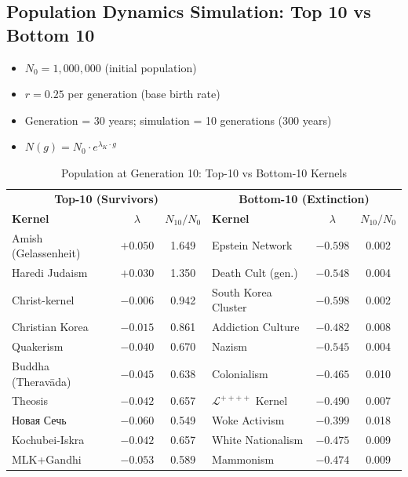 \documentclass[11pt,a4paper]{article}
\theoremstyle{definition}
\theoremstyle{remark}
\newcommand{\LondonOp}{\mathcal{L}^{++++}}  %
\begin{document}
\subsection{Population Dynamics Simulation: Top 10 vs Bottom 10}
\label{sec:pop-dynamics}

\begin{scibox}
\begin{itemize}[noitemsep]
  \item $N_0 = 1{,}000{,}000$ (initial population)
  \item $r = 0.25$ per generation (base birth rate)
  \item Generation = 30 years; simulation = 10 generations (300 years)
  \item $N(g) = N_0 \cdot e^{\lambda_K \cdot g}$
\end{itemize}
\end{scibox}

\begin{table}[H]
\centering
\caption{Population at Generation 10: Top-10 vs Bottom-10 Kernels}
\label{tab:pop-sim}
\begin{tabular}{@{}lcc|lcc@{}}
\toprule
\multicolumn{3}{c|}{\textbf{Top-10 (Survivors)}} &
\multicolumn{3}{c}{\textbf{Bottom-10 (Extinction)}} \\
\textbf{Kernel} & $\lambda$ & $N_{10}/N_0$ &
\textbf{Kernel} & $\lambda$ & $N_{10}/N_0$ \\
\midrule
Amish (Gelassenheit) & $+0.050$ & 1.649 &
  Epstein Network  & $-0.598$ & 0.002 \\
Haredi Judaism       & $+0.030$ & 1.350 &
  Death Cult (gen.)  & $-0.548$ & 0.004 \\
Christ-kernel        & $-0.006$ & 0.942 &
  South Korea Cluster& $-0.598$ & 0.002 \\
Christian Korea      & $-0.015$ & 0.861 &
  Addiction Culture  & $-0.482$ & 0.008 \\
Quakerism            & $-0.040$ & 0.670 &
  Nazism             & $-0.545$ & 0.004 \\
Buddha (Theravāda)   & $-0.045$ & 0.638 &
  Colonialism        & $-0.465$ & 0.010 \\
Theosis              & $-0.042$ & 0.657 &
  $\LondonOp$ Kernel & $-0.490$ & 0.007 \\
\foreignlanguage{russian}{Новая Сечь}
                     & $-0.060$ & 0.549 &
  Woke Activism      & $-0.399$ & 0.018 \\
Kochubei-Iskra       & $-0.042$ & 0.657 &
  White Nationalism  & $-0.475$ & 0.009 \\
MLK+Gandhi           & $-0.053$ & 0.589 &
  Mammonism          & $-0.474$ & 0.009 \\
\bottomrule
\end{tabular}
\end{table}
\end{document}
